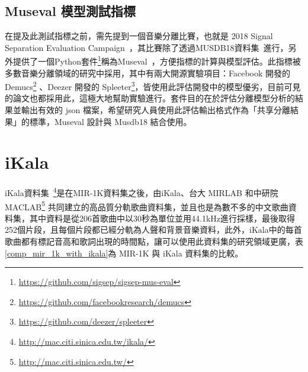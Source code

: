 \subsection{Museval 模型測試指標}
在提及此測試指標之前，需先提到一個音樂分離比賽，也就是 2018 Signal Separation Evaluation Campaign~\cite{stoter20182018}，其比賽除了透過MUSDB18資料集~\cite{rafii2017musdb18,musdb18}進行，另外提供了一個Python套件\footnote{\url{https://github.com/sigsep/sigsep-mus-eval}}稱為Museval~\cite{stoter2018museval}，方便指標的計算與模型評估。此指標被多數音樂分離領域的研究中採用，其中有兩大開源實驗項目：Facebook 開發的 Demucs\footnote{\url{https://github.com/facebookresearch/demucs}} 、Deezer 開發的 Spleeter\footnote{\url{https://github.com/deezer/spleeter}}，皆使用此評估開發中的模型優劣，目前可見的論文也都採用此，這極大地幫助實驗進行。套件目的在於評估分離模型分析的結果並輸出有效的 json 檔案，希望研究人員使用此評估輸出格式作為「共享分離結果」的標準，Museval 設計與 Musdb18 結合使用。


\section{iKala}
iKala資料集~\cite{chan2015vocal}\footnote{\url{http://mac.citi.sinica.edu.tw/ikala/}}是在MIR-1K資料集之後，由iKala、台大 MIRLAB 和中研院 MACLAB\footnote{\url{http://mac.citi.sinica.edu.tw/}} 共同建立的高品質分軌歌曲資料集，並且也是為數不多的中文歌曲資料集，其中資料是從206首歌曲中以30秒為單位並用44.1kHz進行採樣，最後取得252個片段，且每個片段都已經分軌為人聲和背景音樂資料，此外，iKala中的每首歌曲都有標記音高和歌詞出現的時間點，讓可以使用此資料集的研究領域更廣，表\ref{comp_mir_1k_with_ikala}為 MIR-1K 與 iKala 資料集的比較。

